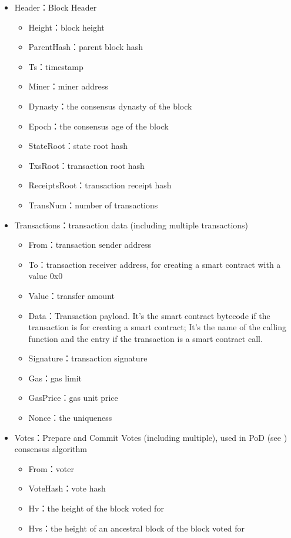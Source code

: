 \begin{itemize}
	\item Header：Block Header
		\begin{itemize}
		\item Height：block height
		\item ParentHash：parent block hash
		\item Ts：timestamp
		\item Miner：miner address
		\item Dynasty：the consensus dynasty of the block
		\item Epoch：the consensus age of the block
		\item StateRoot：state root hash
		\item TxsRoot：transaction root hash
		\item ReceiptsRoot：transaction receipt hash
		\item TransNum：number of transactions
		\end{itemize}
	\item Transactions：transaction data (including multiple transactions)
		\begin{itemize}
		\item From：transaction sender address
		\item To：transaction receiver address, for creating a smart contract with a value 0x0
		\item Value：transfer amount
		\item Data：Transaction payload. It's the smart contract bytecode if the transaction is for creating a smart contract; It's the name of the calling function and the entry if the transaction is a smart contract call.
		\item Signature：transaction signature
		\item Gas：gas limit
		\item GasPrice：gas unit price
		\item Nonce：the uniqueness
		\end{itemize}
	\item Votes：Prepare and Commit Votes (including multiple), used in PoD (see ) consensus algorithm
		\begin{itemize}
		\item From：voter
		\item VoteHash：vote hash
		\item Hv：the height of the block voted for
		\item Hvs：the height of an ancestral block of the block voted for

\end{itemize}
\end{itemize}
